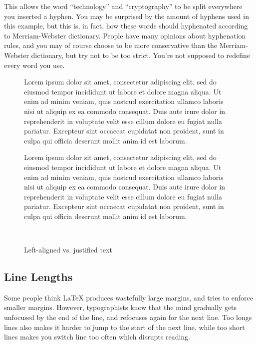 {
\noindent This allows the word ``technology'' and ``cryptography'' to be split everywhere you inserted a hyphen. You may be surprised by the amount of hyphens used in this example, but this is, in fact, how these words should hyphenated according to Merriam-Webster dictionary. People have many opinions about hyphenation rules, and you may of course choose to be more conservative than the Merriam-Webster dictionary, but try not to be too strict. You're not supposed to redefine every word you use.

\begin{figure}
	\centering\tiny\hfill%
	\begin{minipage}{0.4\textwidth}
		\raggedright
		Lorem ipsum dolor sit amet, consectetur adipiscing elit, sed do eiusmod tempor incididunt ut labore et dolore magna aliqua. Ut enim ad minim veniam, quis nostrud exercitation ullamco laboris nisi ut aliquip ex ea commodo consequat. Duis aute irure dolor in reprehenderit in voluptate velit esse cillum dolore eu fugiat nulla pariatur. Excepteur sint occaecat cupidatat non proident, sunt in culpa qui officia deserunt mollit anim id est laborum.
	\end{minipage}\hfill%
	\begin{minipage}{0.4\textwidth}
		Lorem ipsum dolor sit amet, consectetur adipiscing elit, sed do eiusmod tempor incididunt ut labore et dolore magna aliqua. Ut enim ad minim veniam, quis nostrud exercitation ullamco laboris nisi ut aliquip ex ea commodo consequat. Duis aute irure dolor in reprehenderit in voluptate velit esse cillum dolore eu fugiat nulla pariatur. Excepteur sint occaecat cupidatat non proident, sunt in culpa qui officia deserunt mollit anim id est laborum.
	\end{minipage}\hfill~
	\caption{Left-aligned vs. justified text}
	\label{fig:latex:alignment}
\end{figure}

\subsection{Line Lengths}
Some people think \LaTeX{} produces wastefully large margins, and tries to enforce smaller margins. However, typographists know that the mind gradually gets unfocused by the end of the line, and refocuses again for the next line. Too longs lines also makes it harder to jump to the start of the next line, while too short lines makes you switch line too often which disrupts reading. 

}
